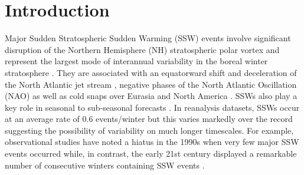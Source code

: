\documentclass[wcd, manuscript]{copernicus}
\begin{document}

%
%
%
%

\newpage

\section{Introduction}

Major Sudden Stratospheric Sudden Warming (SSW) events involve significant disruption of the Northern Hemisphere (NH) stratospheric polar vortex and represent the largest mode of interannual variability in the boreal winter stratosphere \citep{Butler2017,baldwin2020}. They are associated with an equatorward shift and deceleration of the North Atlantic jet stream \citep{Kidston2015}, negative phases of the North Atlantic Oscillation (NAO) \citep{Baldwin_harbingers} as well as cold snaps over Eurasia and North America \citep{Thompson2002,Lehtonen,Tomassini2012,Kretschmer2018}. SSWs also play a key role in seasonal to sub-seasonal forecasts \citep{Domeison2019-1, Domeison2019-2}. In reanalysis datasets, SSWs occur at an average rate of 0.6 events/winter but this varies markedly over the record \citep{Butler2015} suggesting the possibility of variability on much longer timescales. For example, observational studies have noted a hiatus in the 1990s when very few major SSW events occurred \citep{Butler2015,Pawson1999,Shindell1999} while, in contrast, the early 21st century displayed a remarkable number of consecutive winters containing SSW events \citep{Manney2005}. 
\end{document}
